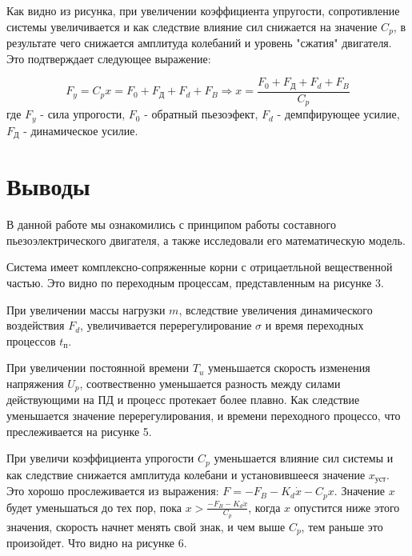 \documentclass[a4paper, 12pt]{article}
\begin{document}
Как видно из рисунка, при увеличении коэффициента упругости, сопротивление системы увеличивается и как следствие влияние сил снижается на значение $C_p$, в результате чего снижается амплитуда колебаний и уровень "сжатия" двигателя. Это подтверждает следующее выражение:

\begin{equation*}
   F_y = C_px = F_0 + F_\text{Д} + F_d + F_B \Rightarrow x = \frac{F_0 + F_\text{Д} + F_d + F_B}{C_p}
\end{equation*}
где $F_y$ - сила упрогости, $F_0$ - обратный пьезоэфект, $F_d$ - демпфирующее усилие, $F_\text{Д}$ - динамическое усилие.

\newpage
\section*{Выводы}
В данной работе мы ознакомились с принципом работы составного пьезоэлектрического двигателя, а также исследовали его математическую модель.\par
Система имеет комплексно-сопряженные корни с отрицаетльной вещественной частью. Это видно по переходным процессам, представленным на рисунке 3. \par
При увеличении массы нагрузки $m$, вследствие увеличения динамического воздействия $F_d$, увеличивается перерегулирование $\sigma$ и время переходных процессов $t_\text{п}$. \par
При увеличении постоянной времени $T_u$ уменьшается скорость изменения напряжения $U_p$, соотвественно уменьшается разность между силами действующими на ПД и процесс протекает более плавно. Как следствие уменьшается значение перерегулирования, и времени переходного процессо, что преслеживается на рисунке 5. \par
При увеличи коэффициента упрогости $C_p$ уменьшается влияние сил системы и как следствие снижается амплитуда колебани и установившееся значение $x_\text{уст}$. Это хорошо прослеживается из выражения: $F = -F_B - K_d\dot{x} - C_px$. Значение $x$ будет уменьшаться до тех пор, пока $x > \displaystyle\frac{-F_B - K_d\dot{x}}{C_p}$, когда $x$ опустится ниже этого значения, скорость начнет менять свой знак, и чем выше $C_p$, тем раньше это произойдет. Что видно на рисунке 6.
\end{document}
